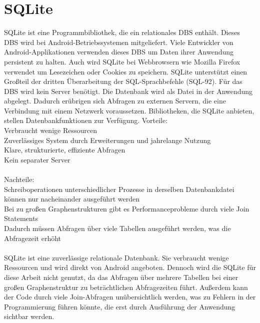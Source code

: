 \section{SQLite}
SQLite ist eine Programmbibliothek, die ein relationales DBS enthält.
Dieses DBS wird bei Android-Betriebssystemen mitgeliefert. Viele
Entwickler von Android-Applikationen verwenden dieses DBS um
Daten ihrer Anwendung persistent zu halten. Auch wird SQLite bei
Webbrowsern wie Mozilla Firefox verwendet um Lesezeichen oder
Cookies zu speichern. SQLite unterstützt einen Großteil der dritten
Überarbeitung der SQL-Sprachbefehle (SQL-92). Für das DBS wird
kein Server benötigt. Die Datenbank wird als Datei in der Anwendung
abgelegt. Dadurch erübrigen sich Abfragen zu externen Servern, die
eine Verbindung mit einem Netzwerk voraussetzen. Bibliotheken, die
SQLite anbieten, stellen Datenbankfunktionen zur Verfügung.
Vorteile:\\
Verbraucht wenige Ressourcen\\
Zuverlässiges System durch Erweiterungen und jahrelange Nutzung\\
Klare, strukturierte, effiziente Abfragen\\
Kein separater Server\\\\
Nachteile: \\
Schreiboperationen unterschiedlicher Prozesse in derselben Datenbankdatei können nur nacheinander ausgeführt werden\\
Bei zu großen Graphenstrukturen gibt es Performanceprobleme durch viele Join Statements\\
Dadurch müssen Abfragen über viele Tabellen ausgeführt werden, was die Abfragezeit erhöht\\\\
SQLite ist eine zuverlässige relationale Datenbank. Sie verbraucht wenige Ressourcen und wird direkt von Android angeboten. Dennoch wird die SQLite für diese Arbeit nicht genutzt, da das Abfragen über mehrere Tabellen bei einer großen Graphenstruktur zu beträchtlichen Abfragezeiten führt. Außerdem kann der Code durch viele Join-Abfragen unübersichtlich werden, was zu Fehlern in der Programmierung führen könnte, die erst durch Ausführung der Anwendung sichtbar werden.






